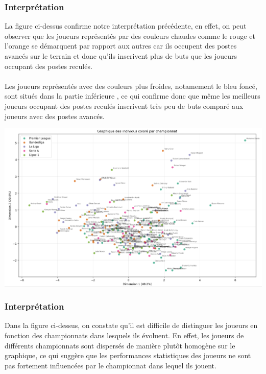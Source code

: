 \documentclass[12pt]{scrartcl}
\begin{document}
            \subsubsection{Interprétation}
                La figure ci-dessus confirme notre interprétation précédente, en effet, on peut observer que les joueurs représentés par des couleurs chaudes comme le rouge et l'orange se démarquent par rapport aux autres car ils occupent des postes avancés sur le terrain et donc qu'ils inscrivent plus de buts que les joueurs occupant des postes reculés.\\\\
                Les joueurs représentés avec des couleurs plus froides, notamement le bleu foncé, sont situés dans la partie inférieure , ce qui confirme donc que même les meilleurs joueurs occupant des postes reculés inscrivent très peu de buts comparé aux joueurs avec des postes avancés.\\

                \begin{center}
                    \includegraphics[width=1\textwidth]{images/graphique_des_individus_championnats.png}
                \end{center}

            \subsubsection{Interprétation}
                Dans la figure ci-dessus, on constate qu'il est difficile de distinguer les joueurs en fonction des championnats dans lesquels ils évoluent. En effet, les joueurs de différents championnats sont dispersés de manière plutôt homogène sur le graphique, ce qui suggère que les performances statistiques des joueurs ne sont pas fortement influencées par le championnat dans lequel ils jouent.\\\\
\end{document}

